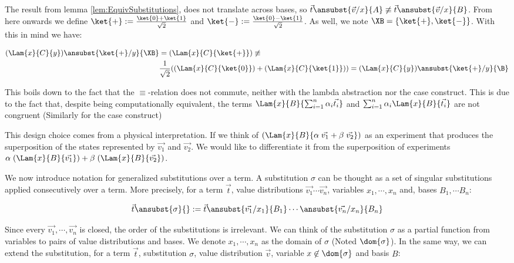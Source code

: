 \begin{remark}
  The result from lemma \ref{lem:EquivSubstitutions}, does not translate across bases, so $\vec{t}\ansubst{\vec{v}/x}{A} \not\equiv \vec{t}\ansubst{\vec{v}/x}{B}$. From here onwards we define $\ket{+}:=\frac{\ket{0}+\ket{1}}{\sqrt{2}}$ and $\ket{-}:=\frac{\ket{0}-\ket{1}}{\sqrt{2}}$. As well, we note $\XB = \{\ket{+}, \ket{-}\}$. With this in mind we have:
  
  \begin{align*}
    (\Lam{x}{C}{y})\ansubst{\ket{+}/y}{\XB} &= (\Lam{x}{C}{\ket{+}}) 
    \not\equiv \\ 
    &\frac{1}{\sqrt{2}} ((\Lam{x}{C}{\ket{0}}) + (\Lam{x}{C}{\ket{1}}))
    = (\Lam{x}{C}{y})\ansubst{\ket{+}/y}{\B}
  \end{align*}
  
  This boils down to the fact that the $\equiv$-relation does not commute, neither with the lambda abstraction nor the case construct. This is due to the fact that, despite being computationally equivalent, the terms $\Lam{x}{B}{\sum_{i=1}^{n}\alpha_i \vec{t_i}}$ and $\sum_{i=1}^{n}\alpha_i \Lam{x}{B}{\vec{t_i}}$ are not congruent (Similarly for the case construct)

  This design choice comes from a physical interpretation. If we think of $(\Lam{x}{B}{\alpha\;\vec{v_1} + \beta\;\vec{v_2}})$ as an experiment that produces the superposition of the states represented by $\vec{v_1}$ and $\vec{v_2}$. We would like to differentiate it from the superposition of experiments $\alpha\;(\Lam{x}{B}{\vec{v_1}}) + \beta\;(\Lam{x}{B}{\vec{v_2}})$.
\end{remark}

We now introduce notation for generalized substitutions over a term. A substitution $\sigma$ can be thought as a set of singular substitutions applied consecutively over a term. More precisely, for a term $\vec{t}$, value distributions $\vec{v_1}\dotsb\vec{v_n}$, variables $x_1,\dotsb ,x_n$ and, bases $B_1,\dotsb B_n$:

\[
  \vec{t}\ansubst{\sigma}{} := \vec{t}\ansubst{\vec{v_1}/x_1}{B_1}\dotsb\ansubst{\vec{v_n}/x_n}{B_n}
\]

Since every $\vec{v_1},\dotsb ,\vec{v_n}$ is closed, the order of the substitutions is irrelevant. We can think of the substitution $\sigma$ as a partial function from variables to pairs of value distributions and bases. We denote $x_1,\dotsb, x_n$ as the domain of $\sigma$ (Noted $\dom{\sigma}$). In the same way, we can extend the substitution, for a term $\vec{t}$, substitution $\sigma$, value distribution $\vec{v}$, variable $x\not\in\dom{\sigma}$ and basis $B$:

